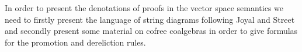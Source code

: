 \documentclass[english,letter paper,12pt,reqno]{article}
\theoremstyle{example}
\begin{document}
In order to present the denotations of proofs in the vector space semantics we need to firstly present the language of string diagrams following Joyal and Street \cite{JSGoTCI,JSGoTCII,ladia,khovdia,mellies, mellies_dia} and secondly present some material on cofree coalgebras in order to give formulas for the promotion and dereliction rules.


\end{document}
